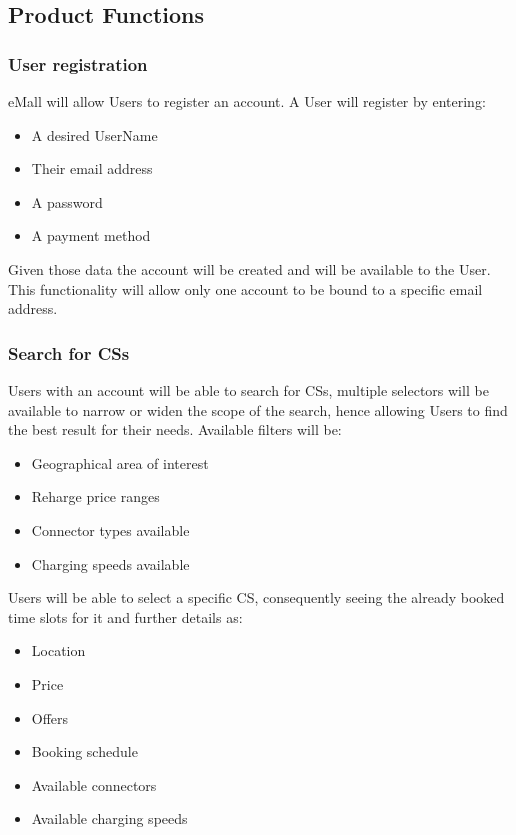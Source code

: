 \documentclass[11pt]{article}
\begin{document}
\subsection{Product Functions}
\label{subsec:prodfunctions}

\subsubsection{User registration}

eMall will allow Users to register an account. A User will register by entering:
\begin{itemize}
    \item A desired UserName
    \item Their email address
    \item A password
    \item A payment method
\end{itemize}
Given those data the account will be created and will be available to the User. This functionality will allow only one account to be bound to a specific email address.

\subsubsection{Search for CSs}
\label{subsubsection:searchForCS}

Users with an account will be able to search for CSs, multiple selectors will be available to narrow or widen the scope of the search, hence allowing Users to find the best result for their needs. Available filters will be:
\begin{itemize}
    \item Geographical area of interest
    \item Reharge price ranges
    \item Connector types available
    \item Charging speeds available
\end{itemize}
Users will be able to select a specific CS, consequently seeing the already booked time slots for it and further details as:
\begin{itemize}
    \item Location
    \item Price
    \item Offers
    \item Booking schedule
    \item Available connectors
    \item Available charging speeds
\end{itemize}
\end{document}
